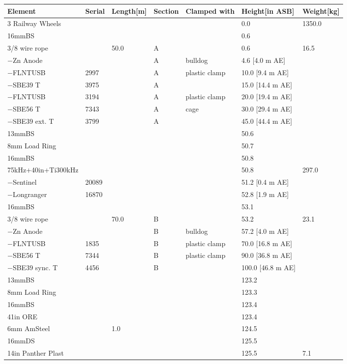 \documentclass{article}
\begin{document}
\begin{tabularx}{\linewidth}{|l|l|l|l|l|l|l|}
\caption{M2: Assembly summary}\\
\hline
\textbf{Element} & \textbf{Serial} & \textbf{Length[m]} & \textbf{Section} & \textbf{Clamped with} & \textbf{Height[in ASB]} & \textbf{Weight[kg]} \\
\hline
3 Railway Wheels &  &  &  &  & 0.0 & 1350.0 \\ \hline
16mmBS &  &  &  &  & 0.6 &  \\ \hline
3/8 wire rope &  & 50.0 & A &  & 0.6 & 16.5 \\ \hline
$-$Zn Anode &  &  & A & bulldog & 4.6 [4.0 m AE] &  \\ \hline
$-$FLNTUSB & 2997 &  & A & plastic clamp & 10.0 [9.4 m AE] &  \\ \hline
$-$SBE39 T & 3975 &  & A &  & 15.0 [14.4 m AE] &  \\ \hline
$-$FLNTUSB & 3194 &  & A & plastic clamp & 20.0 [19.4 m AE] &  \\ \hline
$-$SBE56 T & 7343 &  & A & cage & 30.0 [29.4 m AE] &  \\ \hline
$-$SBE39 ext. T & 3799 &  & A &  & 45.0 [44.4 m AE] &  \\ \hline
13mmBS &  &  &  &  & 50.6 &  \\ \hline
8mm Load Ring &  &  &  &  & 50.7 &  \\ \hline
16mmBS &  &  &  &  & 50.8 &  \\ \hline
75kHz+40in+Ti300kHz &  &  &  &  & 50.8 & 297.0 \\ \hline
$-$Sentinel & 20089 &  &  &  & 51.2 [0.4 m AE] &  \\ \hline
$-$Longranger & 16870 &  &  &  & 52.8 [1.9 m AE] &  \\ \hline
16mmBS &  &  &  &  & 53.1 &  \\ \hline
3/8 wire rope &  & 70.0 & B &  & 53.2 & 23.1 \\ \hline
$-$Zn Anode &  &  & B & bulldog & 57.2 [4.0 m AE] &  \\ \hline
$-$FLNTUSB & 1835 &  & B & plastic clamp & 70.0 [16.8 m AE] &  \\ \hline
$-$SBE56 T & 7344 &  & B & plastic clamp & 90.0 [36.8 m AE] &  \\ \hline
$-$SBE39 sync. T & 4456 &  & B &  & 100.0 [46.8 m AE] &  \\ \hline
13mmBS &  &  &  &  & 123.2 &  \\ \hline
8mm Load Ring &  &  &  &  & 123.3 &  \\ \hline
16mmBS &  &  &  &  & 123.4 &  \\ \hline
41in ORE &  &  &  &  & 123.4 &  \\ \hline
6mm AmSteel &  & 1.0 &  &  & 124.5 &  \\ \hline
16mmDS &  &  &  &  & 125.5 &  \\ \hline
14in Panther Plast &  &  &  &  & 125.5 & 7.1 \\ \hline
\end{tabularx}
\end{document}
